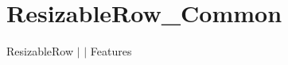 \chapter{Resizable\+Row\+\_\+\+Common }
\hypertarget{md__docs_2_common_2_features_2_resizable_row___common}{}\label{md__docs_2_common_2_features_2_resizable_row___common}
Resizable\+Row \texorpdfstring{$\vert$}{|}  \texorpdfstring{$\vert$}{|} Features



 